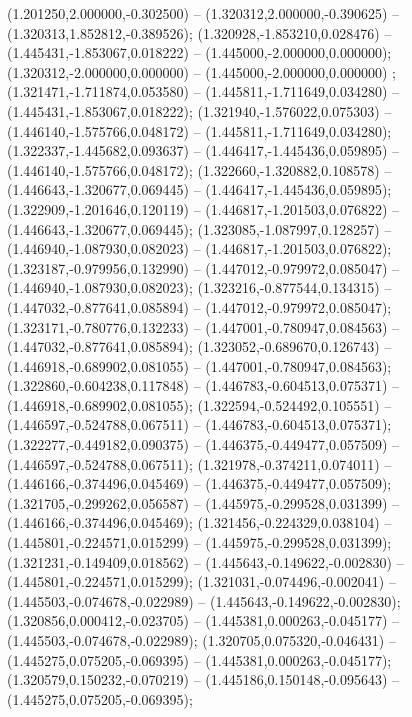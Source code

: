  (1.201250,2.000000,-0.302500) -- (1.320312,2.000000,-0.390625) -- (1.320313,1.852812,-0.389526);
 (1.320928,-1.853210,0.028476) -- (1.445431,-1.853067,0.018222) -- (1.445000,-2.000000,0.000000);
 (1.320312,-2.000000,0.000000) -- (1.445000,-2.000000,0.000000) ;
 (1.321471,-1.711874,0.053580) -- (1.445811,-1.711649,0.034280) -- (1.445431,-1.853067,0.018222);
 (1.321940,-1.576022,0.075303) -- (1.446140,-1.575766,0.048172) -- (1.445811,-1.711649,0.034280);
 (1.322337,-1.445682,0.093637) -- (1.446417,-1.445436,0.059895) -- (1.446140,-1.575766,0.048172);
 (1.322660,-1.320882,0.108578) -- (1.446643,-1.320677,0.069445) -- (1.446417,-1.445436,0.059895);
 (1.322909,-1.201646,0.120119) -- (1.446817,-1.201503,0.076822) -- (1.446643,-1.320677,0.069445);
 (1.323085,-1.087997,0.128257) -- (1.446940,-1.087930,0.082023) -- (1.446817,-1.201503,0.076822);
 (1.323187,-0.979956,0.132990) -- (1.447012,-0.979972,0.085047) -- (1.446940,-1.087930,0.082023);
 (1.323216,-0.877544,0.134315) -- (1.447032,-0.877641,0.085894) -- (1.447012,-0.979972,0.085047);
 (1.323171,-0.780776,0.132233) -- (1.447001,-0.780947,0.084563) -- (1.447032,-0.877641,0.085894);
 (1.323052,-0.689670,0.126743) -- (1.446918,-0.689902,0.081055) -- (1.447001,-0.780947,0.084563);
 (1.322860,-0.604238,0.117848) -- (1.446783,-0.604513,0.075371) -- (1.446918,-0.689902,0.081055);
 (1.322594,-0.524492,0.105551) -- (1.446597,-0.524788,0.067511) -- (1.446783,-0.604513,0.075371);
 (1.322277,-0.449182,0.090375) -- (1.446375,-0.449477,0.057509) -- (1.446597,-0.524788,0.067511);
 (1.321978,-0.374211,0.074011) -- (1.446166,-0.374496,0.045469) -- (1.446375,-0.449477,0.057509);
 (1.321705,-0.299262,0.056587) -- (1.445975,-0.299528,0.031399) -- (1.446166,-0.374496,0.045469);
 (1.321456,-0.224329,0.038104) -- (1.445801,-0.224571,0.015299) -- (1.445975,-0.299528,0.031399);
 (1.321231,-0.149409,0.018562) -- (1.445643,-0.149622,-0.002830) -- (1.445801,-0.224571,0.015299);
 (1.321031,-0.074496,-0.002041) -- (1.445503,-0.074678,-0.022989) -- (1.445643,-0.149622,-0.002830);
 (1.320856,0.000412,-0.023705) -- (1.445381,0.000263,-0.045177) -- (1.445503,-0.074678,-0.022989);
 (1.320705,0.075320,-0.046431) -- (1.445275,0.075205,-0.069395) -- (1.445381,0.000263,-0.045177);
 (1.320579,0.150232,-0.070219) -- (1.445186,0.150148,-0.095643) -- (1.445275,0.075205,-0.069395);
